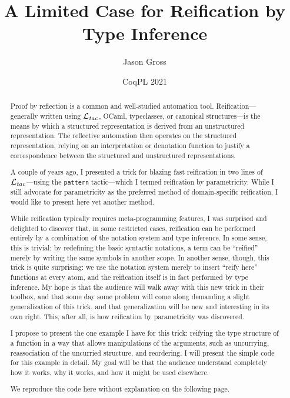 \documentclass{article}
\title{A Limited Case for Reification by Type Inference}
\author{Jason Gross}
\date{CoqPL 2021}
\newcommand{\Ltac}{\texorpdfstring{\ensuremath{\mathcal{L}_{\text{\textit{tac}}}}}{Ltac}}
\begin{document}
\maketitle
\begin{abstract}
Proof by reflection is a common and well-studied automation tool.
Reification---generally written using \Ltac, OCaml, typeclasses, or canonical structures---is the means by which a structured representation is derived from an unstructured representation.
The reflective automation then operates on the structured representation, relying on an interpretation or denotation function to justify a correspondence between the structured and unstructured representations.

A couple of years ago, I presented a trick for blazing fast reification in two lines of \Ltac---using the \texttt{pattern} tactic---which I termed reification by parametricity.
While I still advocate for parametricity as the preferred method of domain-specific reification, I would like to present here yet another method.

While reification typically requires meta-programming features, I was surprised and delighted to discover that, in some restricted cases, reification can be performed entirely by a combination of the notation system and type inference.
In some sense, this is trivial: by redefining the basic syntactic notations, a term can be ``reified'' merely by writing the same symbols in another scope.
In another sense, though, this trick is quite surprising: we use the notation system merely to insert ``reify here'' functions at every atom, and the reification itself is in fact performed by type inference.
My hope is that the audience will walk away with this new trick in their toolbox, and that some day some problem will come along demanding a slight generalization of this trick, and that generalization will be new and interesting in its own right.
This, after all, is how reification by parametricity was discovered.

I propose to present the one example I have for this trick: reifying the type structure of a function in a way that allows manipulations of the arguments, such as uncurrying, reassociation of the uncurried structure, and reordering.
I will present the simple code for this example in detail.
My goal will be that the audience understand completely how it works, why it works, and how it might be used elsewhere.

We reproduce the code here without explanation on the following page.

\clearpage


\end{abstract}
\end{document}
